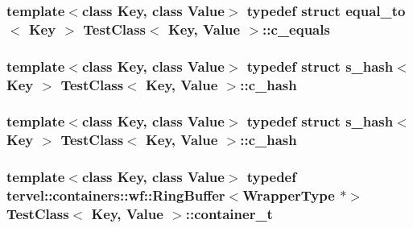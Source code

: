 \subsubsection[{c\+\_\+equals}]{\setlength{\rightskip}{0pt plus 5cm}template$<$class Key, class Value$>$ typedef struct {\bf equal\+\_\+to}$<$ Key $>$ {\bf Test\+Class}$<$ Key, {\bf Value} $>$\+::{\bf c\+\_\+equals}\hspace{0.3cm}{\ttfamily [private]}}\label{class_test_class_aafbd6570cd1aa88768f912c15ca188b5}
\hypertarget{class_test_class_ac0d14c72d1a7e359213955041bd3eea5}{}
\subsubsection[{c\+\_\+hash}]{\setlength{\rightskip}{0pt plus 5cm}template$<$class Key, class Value$>$ typedef struct {\bf s\+\_\+hash}$<$ Key $>$ {\bf Test\+Class}$<$ Key, {\bf Value} $>$\+::{\bf c\+\_\+hash}\hspace{0.3cm}{\ttfamily [private]}}\label{class_test_class_ac0d14c72d1a7e359213955041bd3eea5}
\hypertarget{class_test_class_ac0d14c72d1a7e359213955041bd3eea5}{}
\subsubsection[{c\+\_\+hash}]{\setlength{\rightskip}{0pt plus 5cm}template$<$class Key, class Value$>$ typedef struct {\bf s\+\_\+hash}$<$ Key $>$ {\bf Test\+Class}$<$ Key, {\bf Value} $>$\+::{\bf c\+\_\+hash}\hspace{0.3cm}{\ttfamily [private]}}\label{class_test_class_ac0d14c72d1a7e359213955041bd3eea5}
\hypertarget{class_test_class_abe640a96ccd2edb9a09ad292c8a8b298}{}
\subsubsection[{container\+\_\+t}]{\setlength{\rightskip}{0pt plus 5cm}template$<$class Key, class Value$>$ typedef {\bf tervel\+::containers\+::wf\+::\+Ring\+Buffer}$<${\bf Wrapper\+Type} $\ast$$>$ {\bf Test\+Class}$<$ Key, {\bf Value} $>$\+::{\bf container\+\_\+t}}\label{class_test_class_abe640a96ccd2edb9a09ad292c8a8b298}
\hypertarget{class_test_class_a8169ffe4884a5ad6488eb7893452ebb1}{}
